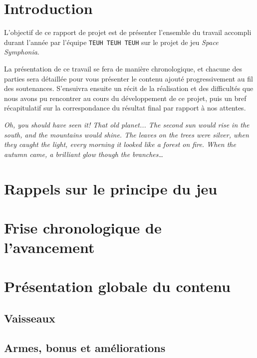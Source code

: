 \documentclass[12pt,a4paper]{article}
\begin{document}
	\newpage
	\setcounter{tocdepth}{3}
	\tableofcontents
	
	\newpage
	\pagestyle{headings}
	
	\section{Introduction}
		\par
		L'objectif de ce rapport de projet est de présenter l'ensemble du travail
		accompli durant l'année par l'équipe \texttt{TEUH TEUH TEUH} sur le projet de jeu \emph{Space Symphonia}.
		\par La présentation de ce travail se fera de manière chronologique, et chacune des parties sera détaillée pour vous présenter le contenu ajouté progressivement au fil des soutenances. S'ensuivra ensuite un récit de la réalisation et des difficultés que nous avons pu rencontrer au cours du développement de ce projet, puis un bref récapitulatif sur la correspondance du résultat final par rapport à nos attentes.
		\vspace{2cm}
		\par \emph{Oh, you should have seen it! That old planet... The second sun would rise in the south, and the mountains would shine. The leaves on the trees were silver, when they caught the light, every morning it looked like a forest on fire. When the autumn came, a brilliant glow though the branches\ldots}
	
	\newpage
	\section{Rappels sur le principe du jeu}
			
	
	\newpage
	\section{Frise chronologique de l'avancement}
		
	
	\newpage
	\section{Présentation globale du contenu}
		\subsection{Vaisseaux}
			
		\subsection{Armes, bonus et améliorations}
			
\end{document}
